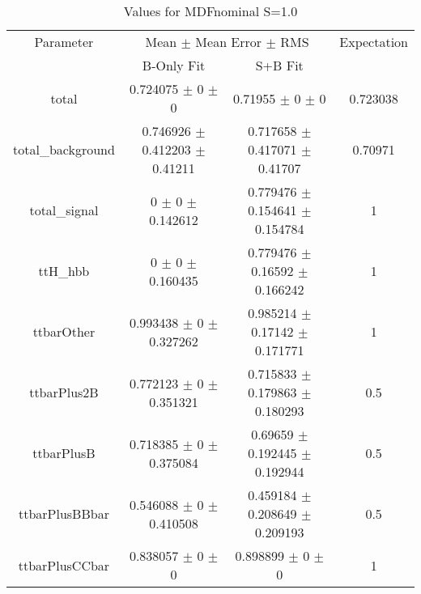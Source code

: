 \begin{table}
\centering
\caption{Values for MDFnominal S=1.0}
\begin{tabular}{cccc}
\toprule
Parameter & \multicolumn{2}{c}{Mean $\pm$ Mean Error $\pm$ RMS} & Expectation\\
 & B-Only Fit & S+B Fit & \\
\midrule
total & \num{0.724075} $\pm$ \num{0} $\pm$ \num{0} & \num{0.71955} $\pm$ \num{0} $\pm$ \num{0} & \num{0.723038}\\
total\_background & \num{0.746926} $\pm$ \num{0.412203} $\pm$ \num{0.41211} & \num{0.717658} $\pm$ \num{0.417071} $\pm$ \num{0.41707} & \num{0.70971}\\
total\_signal & \num{0} $\pm$ \num{0} $\pm$ \num{0.142612} & \num{0.779476} $\pm$ \num{0.154641} $\pm$ \num{0.154784} & \num{1}\\
ttH\_hbb & \num{0} $\pm$ \num{0} $\pm$ \num{0.160435} & \num{0.779476} $\pm$ \num{0.16592} $\pm$ \num{0.166242} & \num{1}\\
ttbarOther & \num{0.993438} $\pm$ \num{0} $\pm$ \num{0.327262} & \num{0.985214} $\pm$ \num{0.17142} $\pm$ \num{0.171771} & \num{1}\\
ttbarPlus2B & \num{0.772123} $\pm$ \num{0} $\pm$ \num{0.351321} & \num{0.715833} $\pm$ \num{0.179863} $\pm$ \num{0.180293} & \num{0.5}\\
ttbarPlusB & \num{0.718385} $\pm$ \num{0} $\pm$ \num{0.375084} & \num{0.69659} $\pm$ \num{0.192445} $\pm$ \num{0.192944} & \num{0.5}\\
ttbarPlusBBbar & \num{0.546088} $\pm$ \num{0} $\pm$ \num{0.410508} & \num{0.459184} $\pm$ \num{0.208649} $\pm$ \num{0.209193} & \num{0.5}\\
ttbarPlusCCbar & \num{0.838057} $\pm$ \num{0} $\pm$ \num{0} & \num{0.898899} $\pm$ \num{0} $\pm$ \num{0} & \num{1}\\
\bottomrule
\end{tabular}
\end{table}